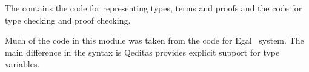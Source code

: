 The  contains the code for representing types,
terms and proofs
and the code for type checking and proof checking.

Much of the code in this module was taken from the code for Egal~\cite{Brown2014} system.
The main difference in the syntax is Qeditas provides explicit support for type variables.
